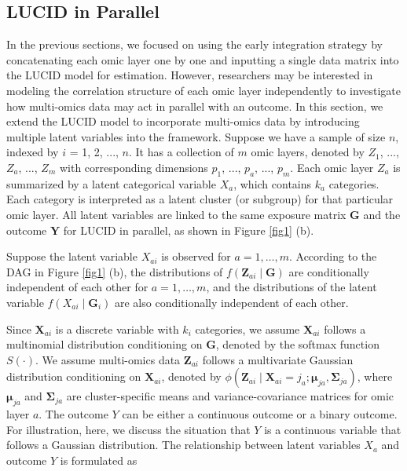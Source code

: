 \subsection{LUCID in Parallel} \label{sec_parallel}

In the previous sections, we focused on using the early integration strategy by concatenating each omic layer one by one and inputting a single data matrix into the LUCID model for estimation. However, researchers may be interested in modeling the correlation structure of each omic layer independently to investigate how multi-omics data may act in parallel with an outcome. In this section, we extend the LUCID model to incorporate multi-omics data by introducing multiple latent variables into the framework. Suppose we have a sample of size $n$, indexed by $i$ = 1, 2, ..., $n$. It has a collection of $m$ omic layers, denoted by $Z_1$, ..., $Z_a$, ..., $Z_m$ with corresponding dimensions $p_1$, ..., $p_a$, ..., $p_m$. Each omic layer $Z_a$ is summarized by a latent categorical variable $X_a$, which contains $k_a$ categories. Each category is interpreted as a latent cluster (or subgroup) for that particular omic layer. All latent variables are linked to the same exposure matrix $\bm G$ and the outcome $\bm Y$ for LUCID in parallel, as shown in Figure \ref{fig1} (b).

Suppose the latent variable $X_{a i}$ is observed for $a=1, \ldots, m$. According to the DAG in Figure \ref{fig1} (b), the distributions of $f\left(\boldsymbol{Z}_{a i} \mid \boldsymbol{G}\right)$ are conditionally independent of each other for $a=1, \ldots, m$, and the distributions of the latent variable $f\left(X_{a i} \mid \boldsymbol{G}_{i}\right)$ are also conditionally independent of each other.

Since $\boldsymbol{X}_{a i}$ is a discrete variable with $k_{i}$ categories, we assume $\boldsymbol{X}
_{a i}$ follows a multinomial distribution conditioning on $\boldsymbol{G}$, denoted by the softmax function $S(\cdot)$. We assume multi-omics data $\boldsymbol{Z}_{a i}$ follows a multivariate Gaussian distribution conditioning on $\boldsymbol{X}_{a i}$, denoted by $\phi\left(\boldsymbol{Z}_{a i} \mid \boldsymbol{X}_{a i}=j_{a} ; \boldsymbol{\mu}_{j a}, \boldsymbol{\Sigma}_{j a}\right)$, where $\boldsymbol{\mu}_{j a}$ and $\boldsymbol{\Sigma}_{j a}$ are cluster-specific means and variance-covariance matrices for omic layer $a$. The outcome $Y$ can be either a continuous outcome or a binary outcome. For illustration, here, we discuss the situation that $Y$ is a continuous variable that follows a Gaussian distribution. The relationship between latent variables $X_{a}$ and outcome $Y$ is formulated as

